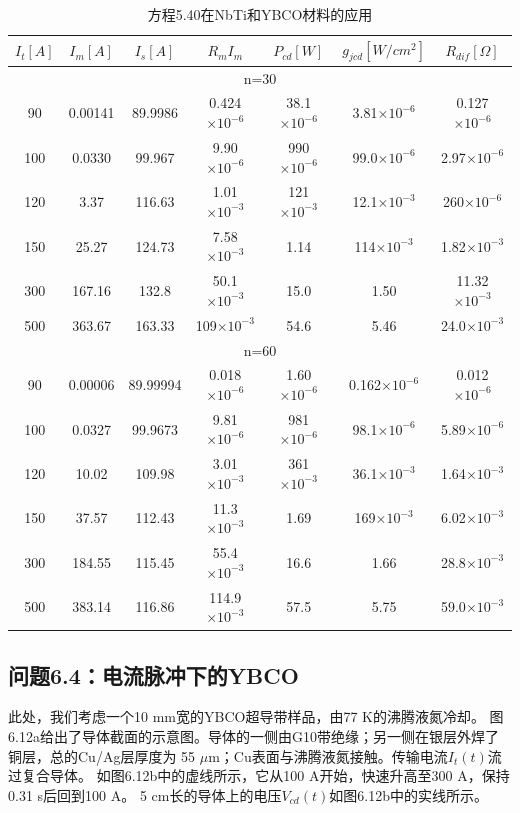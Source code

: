 \begin{table}[htbp]\small
\centering
\caption{方程5.40在NbTi和YBCO材料的应用} %
\begin{tabular}{|c|c|c|c|c|c|c|}
\hline
  $I_t[A]$  &   $ I_m[A]$     &  $I_s[A]$        & $R_mI_m$      &
  $P_{cd}[W]$   &  $g_{jcd}[W/cm^2]$     & $R_{dif}[\Omega]$      \\
  \hline
\multicolumn{7}{|c|}{n=30}                              \\ \hline
90  & 0.00141 & 89.9986  & 0.424$\times10^{-6}$ & 38.1$\times10^{-6}$ &
3.81$\times10^{-6}$  & 0.127$\times10^{-6}$ \\ \hline
100 & 0.0330  & 99.967   & 9.90$\times10^{-6}$  & 990$\times10^{-6}$  &
99.0$\times10^{-6}$  & 2.97$\times10^{-6}$  \\ \hline
120 & 3.37    & 116.63   & 1.01$\times10^{-3}$  & 121$\times10^{-3}$  &
12.1$\times10^{-3}$  & 260$\times10^{-6}$   \\ \hline
150 & 25.27   & 124.73   & 7.58$\times10^{-3}$  & 1.14 &
114$\times10^{-3}$   & 1.82$\times10^{-3}$  \\ \hline
300 & 167.16  & 132.8    & 50.1$\times10^{-3}$  & 15.0 & 1.50  &
11.32$\times10^{-3}$ \\ \hline
500 & 363.67  & 163.33   & 109$\times10^{-3}$   & 54.6 & 5.46  &
24.0$\times10^{-3}$  \\ \hline
\multicolumn{7}{|c|}{n=60}                              \\ \hline
90  & 0.00006 & 89.99994 & 0.018$\times10^{-6}$ & 1.60$\times10^{-6}$ &
0.162$\times10^{-6}$ & 0.012$\times10^{-6}$ \\ \hline
100 & 0.0327  & 99.9673  & 9.81$\times10^{-6}$  & 981$\times10^{-6}$  &
98.1$\times10^{-6}$  & 5.89$\times10^{-6}$  \\ \hline
120 & 10.02   & 109.98   & 3.01$\times10^{-3}$  & 361$\times10^{-3}$  &
36.1$\times10^{-3}$  & 1.64$\times10^{-3}$  \\ \hline
150 & 37.57   & 112.43   & 11.3$\times10^{-3}$  & 1.69 &
169$\times10^{-3}$   & 6.02$\times10^{-3}$  \\ \hline
300 & 184.55  & 115.45   & 55.4$\times10^{-3}$ & 16.6 & 1.66  &
28.8$\times10^{-3}$  \\ \hline
500 & 383.14 & 116.86 & 114.9$\times10^{-3}$ & 57.5 & 5.75 &
59.0$\times10^{-3}$ \\ \hline
\end{tabular}
\end{table}


\subsection{问题6.4：电流脉冲下的YBCO}
此处，我们考虑一个10 mm宽的YBCO超导带样品，由77 K的沸腾液氮冷却。
图6.12a给出了导体截面的示意图。导体的一侧由G10带绝缘；另一侧在银层外焊了铜层，总的Cu/Ag层厚度为
55 $\mu$m；Cu表面与沸腾液氮接触。传输电流$I_t(t)$流过复合导体。
如图6.12b中的虚线所示，它从100 A开始，快速升高至300 A，保持0.31 s后回到100 A。
5 cm长的导体上的电压$V_{cd}(t)$如图6.12b中的实线所示。

